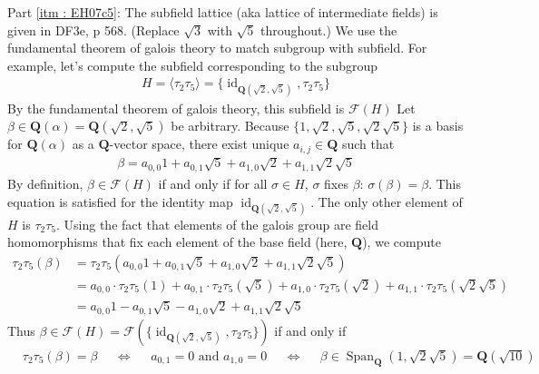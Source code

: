 \documentclass[oneside, english, 11pt]{article}
\newcommand{\fontField}[1]{\mathbf{#1}}
\newcommand{\fixedField}{\mathcal{F}}
\newcommand{\id}{\identityMap}
\DeclareMathOperator{\identityMap}{id}
\newcommand{\Q}{\rationals}
\newcommand{\rationals}{\fontField{Q}}
\DeclareMathOperator{\Span}{Span}
\begin{document}
Part \ref{itm : EH07c5}: The subfield lattice (aka lattice of intermediate fields) is given in DF3e, p 568. (Replace $\sqrt{3}$ with $\sqrt{5}$ throughout.) We use the fundamental theorem of galois theory to match subgroup with subfield. For example, let's compute the subfield corresponding to the subgroup
\begin{align*}
H
=
\langle{}\tau_{2} \tau_{5}\rangle{}
=
\{\id_{\Q(\sqrt{2}, \sqrt{5})}, \tau_{2} \tau_{5}\}
\end{align*}
By the fundamental theorem of galois theory, this subfield is $\fixedField(H)$ Let $\beta \in \Q(\alpha) = \Q(\sqrt{2}, \sqrt{5})$ be arbitrary. Because $\{1, \sqrt{2}, \sqrt{5}, \sqrt{2} \sqrt{5}\}$ is a basis for $\Q(\alpha)$ as a $\Q$-vector space, there exist unique $a_{i, j} \in \Q$ such that
\begin{align*}
\beta
=
a_{0, 0} 1 + a_{0, 1} \sqrt{5} + a_{1, 0} \sqrt{2} + a_{1, 1} \sqrt{2} \sqrt{5}
\end{align*}
By definition, $\beta \in \fixedField(H)$ if and only if for all $\sigma \in H$, $\sigma$ fixes $\beta$: $\sigma(\beta) = \beta$. This equation is satisfied for the identity map $\id_{\Q(\sqrt{2}, \sqrt{5})}$. The only other element of $H$ is $\tau_{2} \tau_{5}$. Using the fact that elements of the galois group are field homomorphisms that fix each element of the base field (here, $\Q$), we compute
\begin{align*}
\tau_{2} \tau_{5}(\beta)
&=
\tau_{2} \tau_{5}(a_{0, 0} 1 + a_{0, 1} \sqrt{5} + a_{1, 0} \sqrt{2} + a_{1, 1} \sqrt{2} \sqrt{5})
\\
&=
a_{0, 0} \cdot \tau_{2} \tau_{5}(1) + a_{0, 1} \cdot \tau_{2} \tau_{5}(\sqrt{5}) + a_{1, 0} \cdot \tau_{2} \tau_{5}(\sqrt{2}) + a_{1, 1} \cdot \tau_{2} \tau_{5}(\sqrt{2} \sqrt{5})
\\
&=
a_{0, 0} 1 - a_{0, 1} \sqrt{5} - a_{1, 0} \sqrt{2} + a_{1, 1} \sqrt{2} \sqrt{5}
\end{align*}
Thus $\beta \in \fixedField(H) = \fixedField(\{\id_{\Q(\sqrt{2}, \sqrt{5})}, \tau_{2} \tau_{5}\})$ if and only if
\begin{align*}
&\tau_{2} \tau_{5}(\beta)
=
\beta
&
&\Leftrightarrow
&
&a_{0, 1} = 0 \text{ and } a_{1, 0} = 0
&
&\Leftrightarrow
&
&\beta \in \Span_{\Q}(1, \sqrt{2} \sqrt{5}) = \Q(\sqrt{10})
\end{align*}
\end{document}
